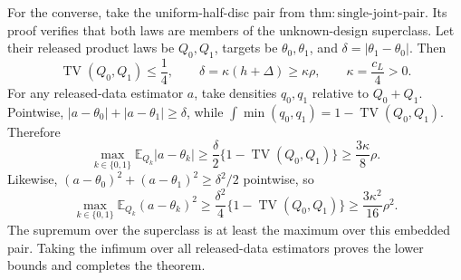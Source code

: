 For the converse, take the uniform-half-disc pair from \(\mathrm{thm:single\text{-}joint\text{-}pair}\).  Its proof verifies that both laws are members of the unknown-design superclass.  Let their released product laws be \(Q_0,Q_1\), targets be \(\theta_0,\theta_1\), and \(\delta=|\theta_1-\theta_0|\).  Then
\[
 \operatorname{TV}(Q_0,Q_1)\leq\frac14,
 \qquad
 \delta=\kappa(h+\Delta)\geq\kappa\rho,
 \qquad \kappa=\frac{c_L}{4}>0.
\]
For any released-data estimator \(a\), take densities \(q_0,q_1\) relative to \(Q_0+Q_1\).  Pointwise, \(|a-\theta_0|+|a-\theta_1|\geq\delta\), while \(\int\min(q_0,q_1)=1-\operatorname{TV}(Q_0,Q_1)\).  Therefore
\[
 \max_{k\in\{0,1\}}\mathbb E_{Q_k}|a-\theta_k|
 \geq\frac\delta2\{1-\operatorname{TV}(Q_0,Q_1)\}
 \geq\frac{3\kappa}{8}\rho.
\]
Likewise, \((a-\theta_0)^2+(a-\theta_1)^2\geq\delta^2/2\) pointwise, so
\[
 \max_{k\in\{0,1\}}\mathbb E_{Q_k}(a-\theta_k)^2
 \geq\frac{\delta^2}{4}\{1-\operatorname{TV}(Q_0,Q_1)\}
 \geq\frac{3\kappa^2}{16}\rho^2.
\]
The supremum over the superclass is at least the maximum over this embedded pair.  Taking the infimum over all released-data estimators proves the lower bounds and completes the theorem.